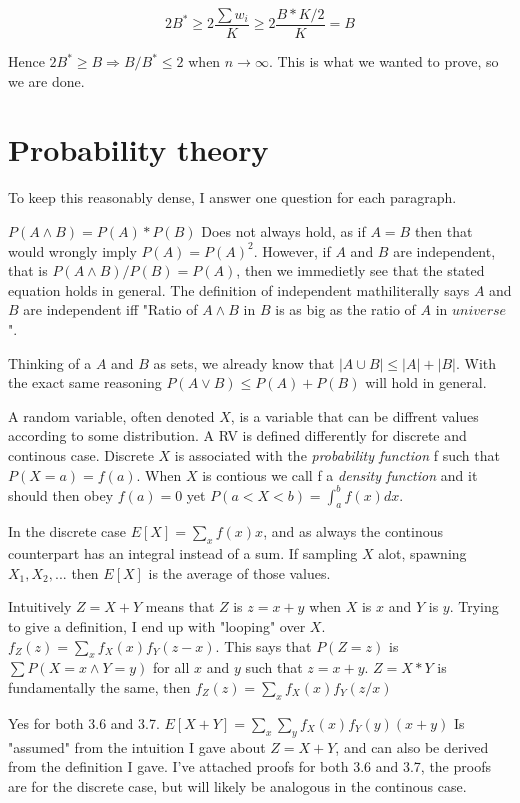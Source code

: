 \documentclass[a4paper,11pt]{article}
\begin{document}
\[
 2B^* \geq 2 \frac{\sum w_i}{K} \geq 2 \frac{B*K/2}{K} = B
\]

Hence $2B^* \geq B \Rightarrow B/B^* \leq 2 $ when $n \to \infty$.
This is what we wanted to prove, so we are done.


\section{Probability theory}
To keep this reasonably dense, I answer one question for each paragraph.

$P(A \wedge B) = P(A) * P(B)$ Does not always hold, as if $A=B$ then that would
wrongly imply $P(A) = P(A)^2$. However, if $A$ and $B$ are
independent, that is $P(A \wedge B)/P(B) = P(A)$, then we immedietly see
that the stated equation holds in general. The definition of independent
mathiliterally says $A$ and $B$ are independent iff
"Ratio of $A \wedge B$ in $B$ is as big as the ratio of $A$ in $universe$".

Thinking of a $A$ and $B$ as sets, we already know that 
$|A \cup B| \leq |A| + |B|$. With the exact same reasoning
$P(A \vee B) \leq P(A) + P(B)$ will hold in general.

A random variable, often denoted $X$, is a variable that can be
diffrent values according to some distribution.
A RV is defined differently for discrete and continous case.
Discrete $X$ is associated with the \emph{probability function} f
such that $P(X = a) = f(a)$. When $X$ is contious we call f a
\emph{density function} and it should then obey $f(a) = 0$ yet
$P(a < X < b) = \int_a^b f(x)dx$.

In the discrete case $E[X] = \sum_x f(x)x$, and as always the continous
counterpart has an integral instead of a sum. If sampling $X$ alot,
spawning $X_1, X_2, ...$ then $E[X]$ is the average of those values.

Intuitively $Z = X + Y$ means that $Z$ is $z = x + y$ when
$X$ is $x$ and $Y$ is $y$. Trying to give a definition, I end up 
with "looping" over $X$.
$f_Z(z) = \sum_x f_X(x)f_Y(z-x)$. This says that $P(Z=z)$ is
$\sum P(X=x \wedge Y=y)$ for all $x$ and $y$ such that $z = x + y$.
$Z = X * Y$ is fundamentally the same, then
$f_Z(z) = \sum_x f_X(x)f_Y(z/x)$

Yes for both 3.6 and 3.7. $ E[X+Y] = \sum_x \sum_y f_X(x)f_Y(y)(x+y) $
Is "assumed" from the
intuition I gave about $Z = X + Y$, and can also be derived from
the definition I gave.
I've attached proofs for both 3.6 and 3.7, the proofs are for
the discrete case, but will likely be analogous in the continous case.
\end{document}
